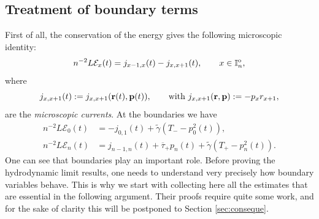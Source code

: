 \documentclass[EJP]{ejpecp} %
\newcommand\T{{\mathbb I}}
\renewcommand{\tilde}{\widetilde}
\renewcommand{\bar}{\overline}
\numberwithin{equation}{section}
\begin{document}
\subsection{Treatment of boundary terms} \label{ssec:boundary}
First of all, the conservation of the energy gives the following microscopic identity: 
\begin{equation}
  \label{eq:en-evol}
  n^{-2} L \mathcal E_x(t) =  j_{x-1,x} (t)-
  j_{x,x+1} (t), \qquad x\in\T_n^{\rm o},
\end{equation}
where \begin{equation}
\label{jx}
 j_{x,x+1} (t):= j_{x,x+1} ({\bf r}(t), {\bf p}(t)), \qquad \text{with }  j_{x,x+1}({\bf r}, {\bf p}) :=-p_xr_{x+1}, 
\end{equation}
are the \emph{microscopic currents}.
At the boundaries we have
\begin{align}
  \label{eq:en-evol-}
 n^{-2} L \mathcal E_0(t) &= - j_{0,1} (t)+ \tilde\gamma  \left(T_- - p_0^2(t) \right),\\
  \label{eq:en-evol+}
   n^{-2} L \mathcal E_n(t) &= j_{n-1,n}(t) + \bar\tau_+ p_n(t) + \tilde\gamma \left(T_+ - p_n^2(t) \right).
\end{align}
One can see that boundaries play an important role. Before proving the hydrodynamic limit results, one needs to understand very precisely how boundary variables behave. This is why we start with collecting here all the estimates that  are essential in the following argument. Their proofs require quite some work, and for the sake of clarity this will be postponed to Section \ref{sec:conseque}. 

\end{document}
